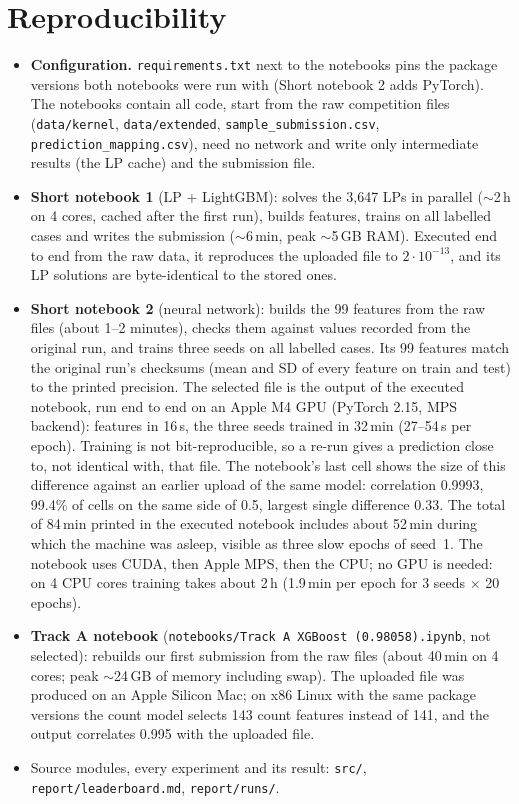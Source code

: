 \documentclass[11pt]{article}
\begin{document}
\appendix
\section{Reproducibility}
\label{app:repro}

\begin{itemize}
\item \textbf{Configuration.} \texttt{requirements.txt} next to the notebooks pins the package
  versions both notebooks were run with (Short notebook 2 adds PyTorch). The notebooks contain all code, start from the raw
  competition files (\texttt{data/kernel}, \texttt{data/extended}, \texttt{sample\_submission.csv},
  \texttt{prediction\_mapping.csv}), need no network and write only intermediate results (the LP
  cache) and the submission file.
\item \textbf{Short notebook 1} (LP + LightGBM): solves the 3{,}647 LPs in parallel ($\sim$2\,h on 4
  cores, cached after the first run), builds features, trains on all labelled cases and writes the
  submission ($\sim$6\,min, peak $\sim$5\,GB RAM). Executed end to end from the raw data, it
  reproduces the uploaded file to $2\cdot 10^{-13}$, and its LP solutions are byte-identical to the
  stored ones.
\item \textbf{Short notebook 2} (neural network): builds the 99 features from the raw files (about
  1--2 minutes), checks them against values recorded from the original run, and trains three seeds
  on all labelled cases. Its 99 features match the original run's checksums (mean and SD of every
  feature on train and test) to the printed precision. The selected file is the output of the
  executed notebook, run end to end on an Apple M4 GPU (PyTorch 2.15, MPS backend): features in 16\,s,
  the three seeds trained in 32\,min (27--54\,s per epoch). Training is not bit-reproducible, so a
  re-run gives a prediction close to, not identical with, that file. The notebook's last cell shows the
  size of this difference against an earlier upload of the same model: correlation 0.9993, 99.4\% of
  cells on the same side of 0.5, largest single difference 0.33. The total of 84\,min printed in the
  executed notebook includes about 52\,min during which the machine was asleep, visible as three slow epochs of
  seed~1. The notebook uses CUDA,
  then Apple MPS, then the CPU; no GPU is needed: on 4 CPU cores training takes about 2\,h (1.9\,min
  per epoch for 3 seeds $\times$ 20 epochs).
\item \textbf{Track A notebook} (\texttt{notebooks/Track A XGBoost (0.98058).ipynb}, not selected):
  rebuilds our first submission from the raw files (about 40\,min on 4 cores; peak $\sim$24\,GB of
  memory including swap). The uploaded file was produced on an Apple Silicon Mac; on x86 Linux with
  the same package versions the count model selects 143 count features instead of 141, and the
  output correlates 0.995 with the uploaded file.
\item Source modules, every experiment and its result: \texttt{src/}, \texttt{report/leaderboard.md},
  \texttt{report/runs/}.
\end{itemize}
\end{document}
